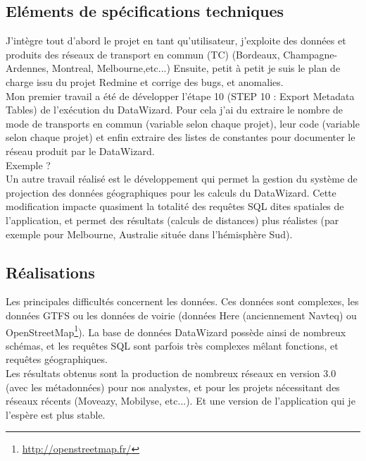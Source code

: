 \begin{itemize}
\subsection{Eléments de spécifications techniques}

J'intègre tout d'abord le projet en tant qu'utilisateur, j'exploite des données et produits des réseaux de transport en commun (TC) (Bordeaux, Champagne-Ardennes, Montreal, Melbourne,etc...) Ensuite, petit à petit je suis le plan de charge issu du projet Redmine et corrige des bugs, et anomalies.\\

Mon premier travail a été de développer l'étape 10 (STEP 10 : Export Metadata Tables) de l'exécution du DataWizard. Pour cela j'ai du extraire le nombre de mode de transports en commun (variable selon chaque projet), leur code (variable selon chaque projet) et enfin extraire des listes de constantes pour documenter le réseau produit par le DataWizard.\\

Exemple ?\\

Un autre travail réalisé est le développement qui permet la gestion du système de projection des données géographiques pour les calculs du DataWizard. Cette modification impacte quasiment la totalité des requêtes SQL dites spatiales de l'application, et permet des résultats (calculs de distances) plus réalistes (par exemple pour Melbourne, Australie située dans l'hémisphère Sud).\\


\subsection{Réalisations}

Les principales difficultés concernent les données. Ces données sont complexes, les données GTFS ou les données de voirie (données Here (anciennement Navteq) ou OpenStreetMap\footnote{\url{http://openstreetmap.fr/}}). La base de données \og DataWizard \fg possède ainsi de nombreux schémas, et les requêtes SQL sont parfois très complexes mêlant fonctions, et requêtes géographiques.\\

Les résultats obtenus sont la production de nombreux réseaux en version 3.0 (avec les métadonnées) pour nos analystes, et pour les projets nécessitant des réseaux récents (Moveazy, Mobilyse, etc...). Et une version de l'application qui je l'espère est plus stable.\\


\end{itemize}
